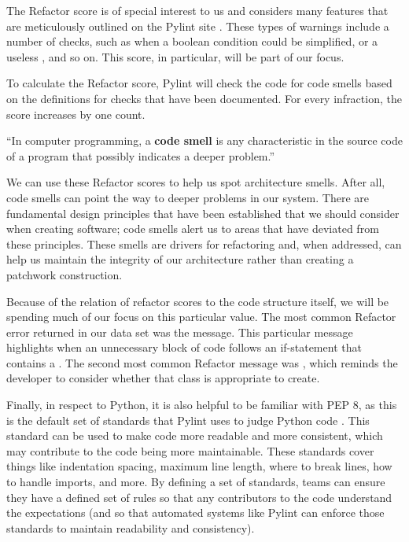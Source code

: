 The Refactor score is of special interest to us and considers many features that are meticulously outlined on the Pylint site \cite{pylint:refactor}. These types of warnings include a number of checks, such as when a boolean condition could be simplified, or a useless , and so on. This score, in particular, will be part of our focus.

To calculate the Refactor score, Pylint will check the code for code smells based on the definitions for checks that have been documented. For every infraction, the score increases by one count. 


\vspace{0.25cm}
\begin{displayquote}
``In computer programming, a \textbf{code smell} is any characteristic in the source code of a program that possibly indicates a deeper problem.'' \cite{wiki:code-smells}
\end{displayquote}
\vspace{0.25cm}

We can use these Refactor scores to help us spot architecture smells. After all, code smells can point the way to deeper problems in our system. There are fundamental design principles that have been established that we should consider when creating software; code smells alert us to areas that have deviated from these principles. These smells are drivers for refactoring and, when addressed, can help us maintain the integrity of our architecture rather than creating a patchwork construction.

Because of the relation of refactor scores to the code structure itself, we will be spending much of our focus on this particular value. The most common Refactor error returned in our data set was the  message. This particular message highlights when an unnecessary block of code follows an if-statement that contains a . The second most common Refactor message was , which reminds the developer to consider whether that class is appropriate to create.

Finally, in respect to Python, it is also helpful to be familiar with PEP 8, as this is the default set of standards that Pylint uses to judge Python code \cite{pylint:pep8}. This standard can be used to make code more readable and more consistent, which may contribute to the code being more maintainable. These standards cover things like indentation spacing, maximum line length, where to break lines, how to handle imports, and more. By defining a set of standards, teams can ensure they have a defined set of rules so that any contributors to the code understand the expectations (and so that automated systems like Pylint can enforce those standards to maintain readability and consistency).

